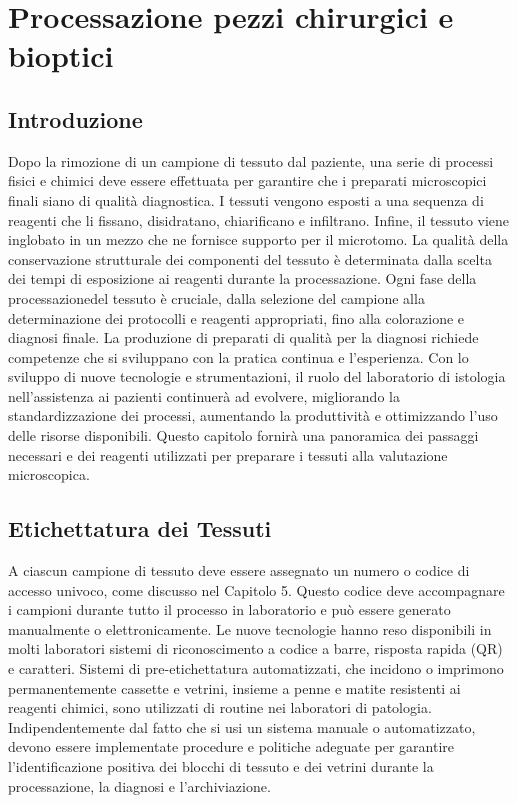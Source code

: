 \chapter{Processazione pezzi chirurgici e bioptici}

\section{Introduzione}
Dopo la rimozione di un campione di tessuto dal paziente, una serie di processi fisici e chimici deve essere effettuata per garantire che i preparati microscopici finali siano di qualità diagnostica. I tessuti vengono esposti a una sequenza di reagenti che li fissano, disidratano, chiarificano e infiltrano. Infine, il tessuto viene inglobato in un mezzo che ne fornisce supporto per il microtomo. La qualità della conservazione strutturale dei componenti del tessuto è determinata dalla scelta dei tempi di esposizione ai reagenti durante la processazione. Ogni fase della processazionedel tessuto è cruciale, dalla selezione del campione alla determinazione dei protocolli e reagenti appropriati, fino alla colorazione e diagnosi finale. La produzione di preparati di qualità per la diagnosi richiede competenze che si sviluppano con la pratica continua e l'esperienza. Con lo sviluppo di nuove tecnologie e strumentazioni, il ruolo del laboratorio di istologia nell'assistenza ai pazienti continuerà ad evolvere, migliorando la standardizzazione dei processi, aumentando la produttività e ottimizzando l'uso delle risorse disponibili. Questo capitolo fornirà una panoramica dei passaggi necessari e dei reagenti utilizzati per preparare i tessuti alla valutazione microscopica.

\section{Etichettatura dei Tessuti}
A ciascun campione di tessuto deve essere assegnato un numero o codice di accesso univoco, come discusso nel Capitolo 5. Questo codice deve accompagnare i campioni durante tutto il processo in laboratorio e può essere generato manualmente o elettronicamente. Le nuove tecnologie hanno reso disponibili in molti laboratori sistemi di riconoscimento a codice a barre, risposta rapida (QR) e caratteri. Sistemi di pre-etichettatura automatizzati, che incidono o imprimono permanentemente cassette e vetrini, insieme a penne e matite resistenti ai reagenti chimici, sono utilizzati di routine nei laboratori di patologia. Indipendentemente dal fatto che si usi un sistema manuale o automatizzato, devono essere implementate procedure e politiche adeguate per garantire l'identificazione positiva dei blocchi di tessuto e dei vetrini durante la processazione, la diagnosi e l'archiviazione.

